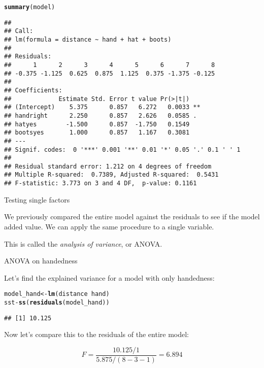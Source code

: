 \documentclass[10pt]{beamer}\usepackage[]{graphicx}\usepackage[]{color}
\makeatletter
\newcommand{\hlopt}[1]{\textcolor[rgb]{0,0,0}{#1}}%
\newcommand{\hlstd}[1]{\textcolor[rgb]{0.345,0.345,0.345}{#1}}%
\newcommand{\hlkwb}[1]{\textcolor[rgb]{0.69,0.353,0.396}{#1}}%
\newcommand{\hlkwd}[1]{\textcolor[rgb]{0.737,0.353,0.396}{\textbf{#1}}}%
\newenvironment{kframe}{%
 \def\at@end@of@kframe{}%
 \ifinner\ifhmode%
  \def\at@end@of@kframe{\end{minipage}}%
  \begin{minipage}{\columnwidth}%
 \fi\fi%
 \def\FrameCommand##1{\hskip\@totalleftmargin \hskip-\fboxsep
 \colorbox{shadecolor}{##1}\hskip-\fboxsep
     \hskip-\linewidth \hskip-\@totalleftmargin \hskip\columnwidth}%
 \MakeFramed {\advance\hsize-\width
   \@totalleftmargin\z@ \linewidth\hsize
   \@setminipage}}%
 {\par\unskip\endMakeFramed%
 \at@end@of@kframe}
\newenvironment{knitrout}{}{} %
\makeatother
\begin{document}
\begin{frame}[fragile]

\begin{knitrout}
\color{fgcolor}\begin{kframe}
\begin{alltt}
\hlkwd{summary}\hlstd{(model)}
\end{alltt}
\begin{verbatim}
## 
## Call:
## lm(formula = distance ~ hand + hat + boots)
## 
## Residuals:
##      1      2      3      4      5      6      7      8 
## -0.375 -1.125  0.625  0.875  1.125  0.375 -1.375 -0.125 
## 
## Coefficients:
##             Estimate Std. Error t value Pr(>|t|)   
## (Intercept)    5.375      0.857   6.272   0.0033 **
## handright      2.250      0.857   2.626   0.0585 . 
## hatyes        -1.500      0.857  -1.750   0.1549   
## bootsyes       1.000      0.857   1.167   0.3081   
## ---
## Signif. codes:  0 '***' 0.001 '**' 0.01 '*' 0.05 '.' 0.1 ' ' 1
## 
## Residual standard error: 1.212 on 4 degrees of freedom
## Multiple R-squared:  0.7389,	Adjusted R-squared:  0.5431 
## F-statistic: 3.773 on 3 and 4 DF,  p-value: 0.1161
\end{verbatim}
\end{kframe}
\end{knitrout}

\end{frame}

\begin{frame}{Testing single factors}

We previously compared the entire model against the residuals to see if the model added value. We can apply the same procedure to a single variable.

This is called the \emph{analysis of variance}, or ANOVA.

\end{frame}

\begin{frame}[fragile]{ANOVA on handedness}

Let's find the explained variance for a model with only handedness:
\small
\begin{knitrout}
\color{fgcolor}\begin{kframe}
\begin{alltt}
\hlstd{model_hand} \hlkwb{<-} \hlkwd{lm}\hlstd{(distance} \hlopt{~} \hlstd{hand)}
\hlstd{sst} \hlopt{-} \hlkwd{ss}\hlstd{(}\hlkwd{residuals}\hlstd{(model_hand))}
\end{alltt}
\begin{verbatim}
## [1] 10.125
\end{verbatim}
\end{kframe}
\end{knitrout}
\normalsize
Now let's compare this to the residuals of the entire model:

\pause
\[ F = \frac{10.125 /1}{5.875 / (8-3-1)} = 6.894 \]

\end{frame}
\end{document}
